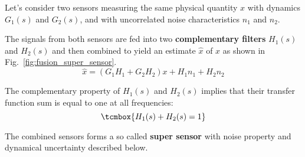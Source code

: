Let's consider two sensors measuring the same physical quantity \(x\) with
dynamics \(G_1(s)\) and \(G_2(s)\), and with uncorrelated noise characteristics
\(n_1\) and \(n_2\).

\bigskip

The signals from both sensors are fed into two \textbf{complementary filters} \(H_1(s)\)
and \(H_2(s)\) and then combined to yield an estimate \(\hat{x}\) of \(x\) as
shown in Fig.~\ref{fig:fusion_super_sensor}.
\begin{equation*}
  \hat{x} = \left(G_1 H_1 + G_2 H_2\right) x + H_1 n_1 + H_2 n_2
\end{equation*}

The complementary property of \(H_1(s)\) and \(H_2(s)\) implies that their transfer function sum is equal to one at all frequencies:
\begin{equation*}
  \tcmbox{H_1(s) + H_2(s) = 1}
\end{equation*}

The combined sensors forms a so called \textbf{super sensor} with noise property
and dynamical uncertainty described below.
